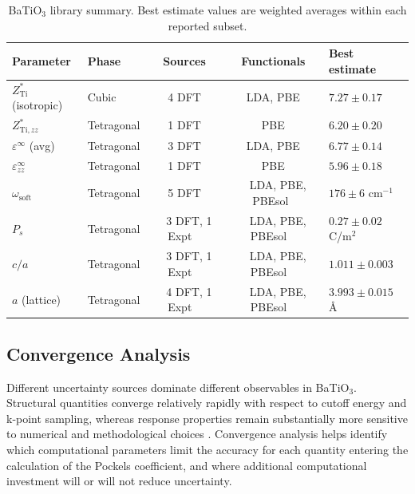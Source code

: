 \documentclass[prb,twocolumn,superscriptaddress,amsmath,amssymb,longbibliography]{revtex4-2}
\begin{document}
\begin{table}
\centering
\caption{BaTiO$_3$ library summary. Best estimate values are weighted averages within each reported subset. 
}
\label{tab:literature_library}
\begin{tabular}{llccl}
\toprule
Parameter & Phase & Sources & Functionals & Best estimate \\
\midrule
$Z^*_{\mathrm{Ti}}$ (isotropic) & Cubic & 4 DFT & LDA, PBE & $7.27 \pm 0.17$ \\
$Z^*_{\mathrm{Ti},zz}$ & Tetragonal & 1 DFT & PBE & $6.20 \pm 0.20$ \\
$\varepsilon^\infty$ (avg) & Tetragonal & 3 DFT & LDA, PBE & $6.77 \pm 0.14$ \\
$\varepsilon^\infty_{zz}$ & Tetragonal & 1 DFT & PBE & $5.96 \pm 0.18$ \\
$\omega_{\mathrm{soft}}$ & Tetragonal & 5 DFT & ~ LDA, PBE, PBEsol~ & $176 \pm 6$ cm$^{-1}$ \\
$P_s$ & Tetragonal & ~ 3 DFT, 1 Expt ~ & ~ LDA, PBE, PBEsol ~& $0.27 \pm 0.02$ C/m$^2$ \\
$c/a$ & Tetragonal & ~ 3 DFT, 1 Expt ~ & ~ LDA, PBE, PBEsol ~& $1.011 \pm 0.003$ \\
$a$ (lattice) & Tetragonal & ~ 4 DFT, 1 Expt ~ & ~ LDA, PBE, PBEsol ~ & $3.993 \pm 0.015$ \AA \\
\bottomrule
\end{tabular}
\end{table}


\subsection{Convergence Analysis}

Different uncertainty sources dominate different observables in BaTiO$_3$. Structural quantities converge relatively rapidly with respect to cutoff energy and k-point sampling, whereas response properties remain substantially more sensitive to numerical and methodological choices \cite{Hally2018}. Convergence analysis helps identify which computational parameters limit the accuracy for each quantity entering the calculation of the Pockels coefficient, and where additional computational investment will or will not reduce uncertainty. 
\end{document}
